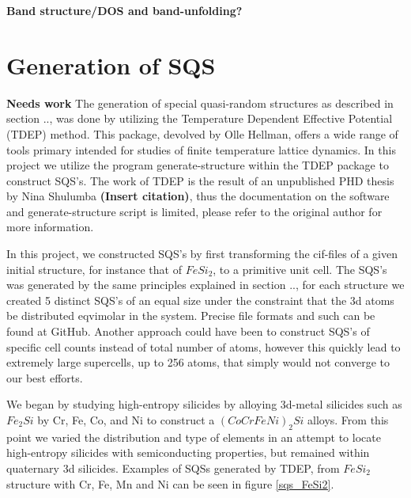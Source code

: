 \textbf{Band structure/DOS and band-unfolding?}

\section{Generation of SQS}
\textbf{Needs work}
The generation of special quasi-random structures as described in section .., was done by utilizing the Temperature Dependent Effective Potential (TDEP) method. This package, devolved by Olle Hellman, offers a wide range of tools primary intended for studies of finite temperature lattice dynamics. In this project we utilize the program generate-structure within the TDEP package to construct SQS's. The work of TDEP is the result of an unpublished PHD thesis by Nina Shulumba \textbf{(Insert citation)}, thus the documentation on the software and generate-structure script is limited, please refer to the original author for more information. 

In this project, we constructed SQS's by first transforming the cif-files of a given initial structure, for instance that of $FeSi_2$, to a primitive unit cell. The SQS's was generated by the same principles explained in section .., for each structure we created 5 distinct SQS's of an equal size under the constraint that the 3d atoms be distributed eqvimolar in the system. Precise file formats and such can be found at GitHub. Another approach could have been to construct SQS's of specific cell counts instead of total number of atoms, however this quickly lead to extremely large supercells, up to 256 atoms, that simply would not converge to our best efforts. 

We began by studying high-entropy silicides by alloying 3d-metal silicides such as $Fe_2Si$ by Cr, Fe, Co, and Ni to construct a $(CoCrFeNi)_2Si$ alloys. From this point we varied the distribution and type of elements in an attempt to locate high-entropy silicides with semiconducting properties, but remained within quaternary 3d silicides. Examples of SQSs generated by TDEP, from $FeSi_2$ structure with Cr, Fe, Mn and Ni can be seen in figure \ref{sqs_FeSi2}.

